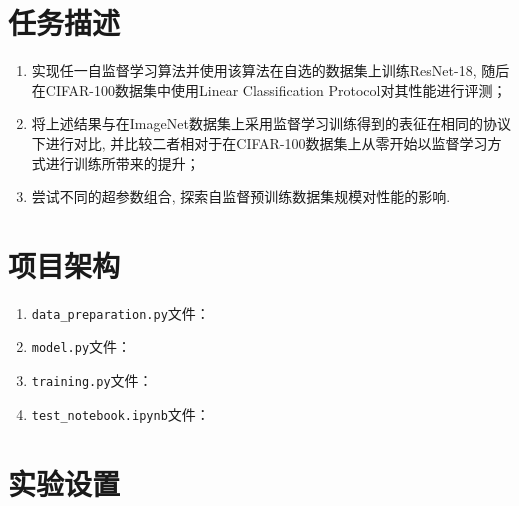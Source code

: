 \documentclass[notitlepage,cs4size,punct,oneside]{ctexrep}
\numberwithin{equation}{chapter}
\theoremstyle{mystyle}
\begin{document}
\section{任务描述}
\begin{enumerate}
\item 实现任一自监督学习算法并使用该算法在自选的数据集上训练ResNet-18, 随后在CIFAR-100数据集中使用Linear Classification Protocol对其性能进行评测；
\item 将上述结果与在ImageNet数据集上采用监督学习训练得到的表征在相同的协议下进行对比, 并比较二者相对于在CIFAR-100数据集上从零开始以监督学习方式进行训练所带来的提升；
\item 尝试不同的超参数组合, 探索自监督预训练数据集规模对性能的影响.
\end{enumerate}

\section{项目架构}
\begin{enumerate}
    \item \texttt{data\_preparation.py}文件：
    \item \texttt{model.py}文件：
    \item \texttt{training.py}文件：
    \item \texttt{test\_notebook.ipynb}文件：
    \end{enumerate}

\section{实验设置}
\end{document}
